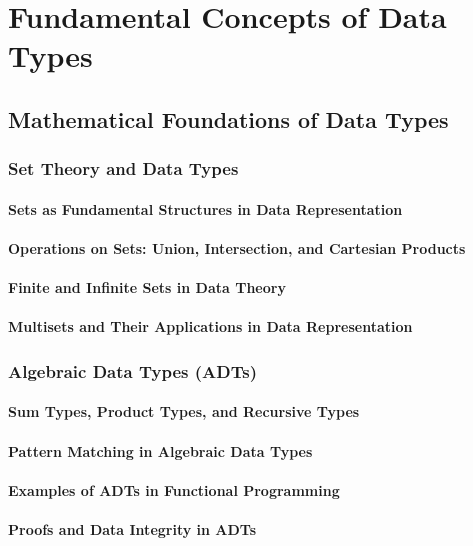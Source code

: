 \documentclass[12pt, oneside]{book}
\begin{document}
\chapter{Fundamental Concepts of Data Types}
\section{Mathematical Foundations of Data Types}
\subsection{Set Theory and Data Types}
\subsubsection{Sets as Fundamental Structures in Data Representation}
\subsubsection{Operations on Sets: Union, Intersection, and Cartesian Products}
\subsubsection{Finite and Infinite Sets in Data Theory}
\subsubsection{Multisets and Their Applications in Data Representation}
\subsection{Algebraic Data Types (ADTs)}
\subsubsection{Sum Types, Product Types, and Recursive Types}
\subsubsection{Pattern Matching in Algebraic Data Types}
\subsubsection{Examples of ADTs in Functional Programming}
\subsubsection{Proofs and Data Integrity in ADTs}
\end{document}
